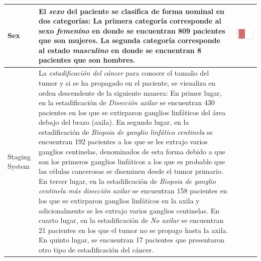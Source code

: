 \begin{table}[!htb]
	\footnotesize
	\begin{threeparttable}
		\begin{tabular}{p{2.5cm} p{7cm} p{6.5cm}} \toprule
			
			Sex
			& El \textit{sexo} del paciente se clasifica de forma nominal en dos categorías: La primera categoría corresponde al sexo \textit{femenino} en donde se encuentran 809 pacientes que son mujeres. La segunda categoría corresponde al estado \textit{masculino} en donde se encuentran 8 pacientes que son hombres.
			
			& \begin{center}\includegraphics[width=1\linewidth]{NOTEBOOK/IMAGENES_DESCRIPTIVAS/39_sex}\end{center}
			\\ \hline
			
			
			Staging System
			& La \textit{estadificación del cáncer} para conocer el tamaño del tumor y si se ha propagado en el paciente, se visualiza en orden descendente de la siguiente manera: En primer lugar, en la estadificación de \textit{Disección axilar} se encuentran 430 pacientes en los que se extirparon ganglios linfáticos del área debajo del brazo (axila). En segundo lugar, en la estadificación de \textit{Biopsia de ganglio linfático centinela} se encuentran 192 pacientes a los que se les extrajo varios ganglios centinelas, denominados de esta forma debido a que son los primeros ganglios linfáticos a los que es probable que las células cancerosas se diseminen desde el tumor primario. En tercer lugar, en la estadificación de \textit{Biopsia de ganglio centinela más disección axilar} se encuentran 158 pacientes en los que se extirparon ganglios linfáticos en la axila y adicionalmente se les extrajo varios ganglios centinelas. En cuarto lugar, en la estadificación de \textit{No axilar} se encuentran 21 pacientes en los que el tumor no se propago hasta la axila. En quinto lugar, se encuentran 17 pacientes que presentaron otro tipo de estadificación del cáncer.
			

\end{tabular}
\end{threeparttable}
\end{table}
